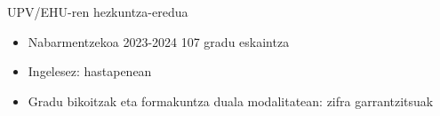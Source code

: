 \documentclass[
 10pt,%
 compress,%
 t,       %
 xcolor=svgnames
]{beamer}
\theoremstyle{definition} \newtheorem{definicion}{Definicion}[section]
\theoremstyle{propiedades} \newtheorem{propiedades}{Propiedades}[section]
\begin{document}
\begin{frame}{UPV/EHU-ren hezkuntza-eredua}
{\begin{itemize}
    \begin{itemize}
    	\item Nabarmentzekoa 2023-2024 107 gradu eskaintza 
    	\item Ingelesez: hastapenean
    	\item Gradu bikoitzak eta formakuntza duala modalitatean: zifra garrantzitsuak
    \end{itemize}   
	
\end{itemize}


}

\end{frame}





%
%



\end{document}
